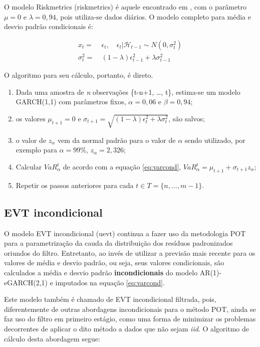 \documentclass[1p]{elsarticle}
\theoremstyle{definition}
\begin{document}
O modelo Riskmetrics (riskmetrics) é aquele encontrado em \cite{RiskMetrics1995}, com o parâmetro $\mu = 0$ e $\lambda = 0,94$, pois utiliza-se dados diários. O modelo completo para média e desvio padrão condicionais é:

\begin{align}
	x_t=&\ \epsilon_t, \quad \epsilon_t|\mathcal{H}_{t-1} \sim N(0, \sigma^2_t)\\
	\sigma^2_t=&\ (1-\lambda)\epsilon^2_{t-1}+\lambda \sigma^2_{t-1}
\end{align}

O algoritmo para seu cálculo, portanto, é direto. 

\begin{enumerate}
	\item Dada uma amostra de \emph{n} observações \{t-n+1, \ldots, t\}, estima-se um modelo GARCH(1,1) com parâmetros fixos, $\alpha=0,06$ e $\beta = 0,94$;
	\item os valores $\mu_{t+1} = 0$ e $\sigma_{t+1}=\sqrt{(1-\lambda)\epsilon^2_{t}+\lambda \sigma^2_{t}}$, são salvos;
	\item o valor de $z_\alpha$ vem da normal padrão para o valor de $\alpha$ sendo utilizado, por exemplo para $\alpha = 99\%$, $z_\alpha = 2,326$;
	\item Calcular $VaR^t_\alpha$ de acordo com a equação \eqref{eq:varcond}, $VaR_\alpha^t=\mu_{t+1}+\sigma_{t+1}z_\alpha$;
	\item Repetir os passos anteriores para cada $t \in T = \{n, \ldots, m-1\}$.
\end{enumerate}

\subsection{EVT incondicional}
\label{sec:appendix_uevt}

O modelo EVT incondicional (uevt) continua a fazer uso da metodologia POT para a parametrização da cauda da  distribuição dos resíduos padronizados oriundos do filtro. Entretanto, ao invés de utilizar a previsão mais recente para os valores de média e desvio padrão, ou seja, seus valores condicionais, são calculados a média e desvio padrão \textbf{incondicionais} do modelo AR(1)-eGARCH(2,1) e imputados na equação \ref{eq:varcond}.

Este modelo também é chamado de EVT incondicional filtrada, pois, diferentemente de outras abordagens incondicionais para o método POT, ainda se faz uso do filtro em primeiro estágio, como uma forma de minimizar os problemas decorrentes de aplicar o dito método a dados que não sejam \emph{iid}. O algoritmo de cálculo desta abordagem segue:
\end{document}

